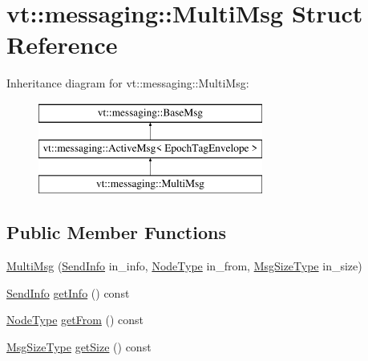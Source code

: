 \hypertarget{structvt_1_1messaging_1_1_multi_msg}{}\section{vt\+:\+:messaging\+:\+:Multi\+Msg Struct Reference}
\label{structvt_1_1messaging_1_1_multi_msg}
Inheritance diagram for vt\+:\+:messaging\+:\+:Multi\+Msg\+:\begin{figure}[H]
\begin{center}
\leavevmode
\includegraphics[height=3.000000cm]{structvt_1_1messaging_1_1_multi_msg}
\end{center}
\end{figure}
\subsection*{Public Member Functions}
\begin{DoxyCompactItemize}
\item 
\hyperlink{structvt_1_1messaging_1_1_multi_msg_acd927cddf86133a0cf418ac8e44ccea0}{Multi\+Msg} (\hyperlink{structvt_1_1messaging_1_1_send_info}{Send\+Info} in\+\_\+info, \hyperlink{namespacevt_a866da9d0efc19c0a1ce79e9e492f47e2}{Node\+Type} in\+\_\+from, \hyperlink{namespacevt_a408e86a8c7c89309b52907dc5a513924}{Msg\+Size\+Type} in\+\_\+size)
\item 
\hyperlink{structvt_1_1messaging_1_1_send_info}{Send\+Info} \hyperlink{structvt_1_1messaging_1_1_multi_msg_a199e909c6fe0ad3dac7a9204311c3e58}{get\+Info} () const
\item 
\hyperlink{namespacevt_a866da9d0efc19c0a1ce79e9e492f47e2}{Node\+Type} \hyperlink{structvt_1_1messaging_1_1_multi_msg_aafefb2ed9f0321e9c4b746a3168eec8c}{get\+From} () const
\item 
\hyperlink{namespacevt_a408e86a8c7c89309b52907dc5a513924}{Msg\+Size\+Type} \hyperlink{structvt_1_1messaging_1_1_multi_msg_a5dd6e171088baef677075e3f29d694f5}{get\+Size} () const
\end{DoxyCompactItemize}
